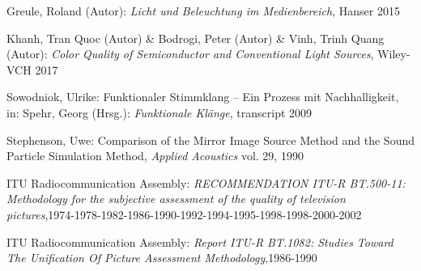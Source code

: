 \begin{thebibliography}{}
Greule, Roland (Autor):
\emph{Licht und Beleuchtung im Medienbereich}, Hanser 2015 

Khanh, Tran Quoc (Autor) \& Bodrogi, Peter (Autor) \& Vinh, Trinh Quang (Autor):
\emph{Color Quality of Semiconductor and Conventional Light Sources}, Wiley-VCH 2017


Sowodniok, Ulrike: 
\glqq Funktionaler Stimmklang -- Ein Prozess mit Nachhalligkeit\grqq, 
in: Spehr, Georg (Hrsg.): \emph{Funktionale Klänge}, transcript 2009

Stephenson, Uwe: 
\glqq Comparison of the Mirror Image Source Method and the Sound Particle Simulation Method\grqq, 
\emph{Applied Acoustics} vol. 29, 1990

ITU Radiocommunication Assembly:
\emph{RECOMMENDATION ITU-R BT.500-11: Methodology for the subjective assessment of the quality of television pictures},1974-1978-1982-1986-1990-1992-1994-1995-1998-1998-2000-2002

ITU Radiocommunication Assembly:
\emph{Report ITU-R BT.1082: Studies Toward The Unification Of Picture Assessment Methodology},1986-1990

\end{thebibliography}

\clearpage\thispagestyle{empty}
\eigen  %












